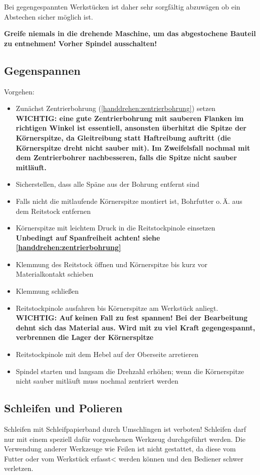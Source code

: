 \documentclass{\basedir/fablab-document}
\begin{document}
Bei gegengespannten Werkstücken ist daher sehr sorgfältig abzuwägen ob ein Abstechen sicher möglich ist. 

\textbf{Greife niemals in die drehende Maschine, um das abgestochene Bauteil zu entnehmen! Vorher Spindel ausschalten!}


\subsection{Gegenspannen}
\label{handdrehen:gegenspannen}

Vorgehen:
\begin{itemize}
\item Zunächst Zentrierbohrung (\ref{handdrehen:zentrierbohrung}) setzen\\
	\textbf{WICHTIG: eine gute Zentrierbohrung mit sauberen Flanken im richtigen Winkel ist essentiell, ansonsten überhitzt die Spitze der Körnerspitze, da Gleitreibung statt Haftreibung auftritt (die Körnerspitze dreht nicht sauber mit). Im Zweifelsfall nochmal mit dem Zentrierbohrer nachbesseren, falls die Spitze nicht sauber mitläuft.} 
\item Sicherstellen, dass alle Späne aus der Bohrung entfernt sind
\item Falls nicht die mitlaufende Körnerspitze montiert ist, Bohrfutter o.\,Ä. aus dem Reitstock entfernen
\item Körnerspitze mit leichtem Druck in die Reitstockpinole einsetzen\\
\textbf{Unbedingt auf Spanfreiheit achten! siehe \ref{handdrehen:zentrierbohrung}}
\item Klemmung des Reitstock öffnen und Körnerspitze bis kurz vor Materialkontakt schieben 
\item Klemmung schließen
\item Reitstockpinole ausfahren bis Körnerspitze am Werkstück anliegt.\\
\textbf{WICHTIG: Auf keinen Fall zu fest spannen! Bei der Bearbeitung dehnt sich das Material aus. Wird mit zu viel Kraft gegengespannt, verbrennen die Lager der Körnerspitze}
\item Reitstockpinole mit dem Hebel auf der Oberseite arretieren
\item Spindel starten und langsam die Drehzahl erhöhen; wenn die Körnerspitze nicht sauber mitläuft muss nochmal zentriert werden
\end{itemize}

\subsection{Schleifen und Polieren}
Schleifen mit Schleifpapierband durch Umschlingen ist verboten!
Schleifen darf nur mit einem speziell dafür vorgesehenen Werkzeug durchgeführt werden. Die Verwendung anderer Werkzeuge wie Feilen ist nicht gestattet, da diese vom Futter oder vom Werkstück erfasst< werden können und den Bediener schwer verletzen.
\end{document}
